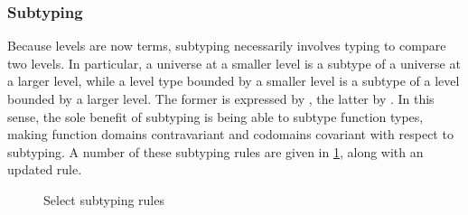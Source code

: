 \documentclass[a4paper,UKenglish,cleveref,autoref,thm-restate]{lipics-v2021}
\begin{document}
\subsubsection{Subtyping}

Because levels are now terms,
subtyping necessarily involves typing to compare two levels.
In particular, a universe at a smaller level is a subtype of a universe at a larger level,
while a level type bounded by a smaller level is a subtype of a level bounded by a larger level.
The former is expressed by , the latter by .
In this sense, the sole benefit of subtyping is being able to subtype function types,
making function domains contravariant and codomains covariant with respect to subtyping.
A number of these subtyping rules are given in \cref{fig:subtyping},
along with an updated  rule.

\begin{figure}
\caption{Select subtyping rules}
\label{fig:subtyping}
\end{figure}
\end{document}
